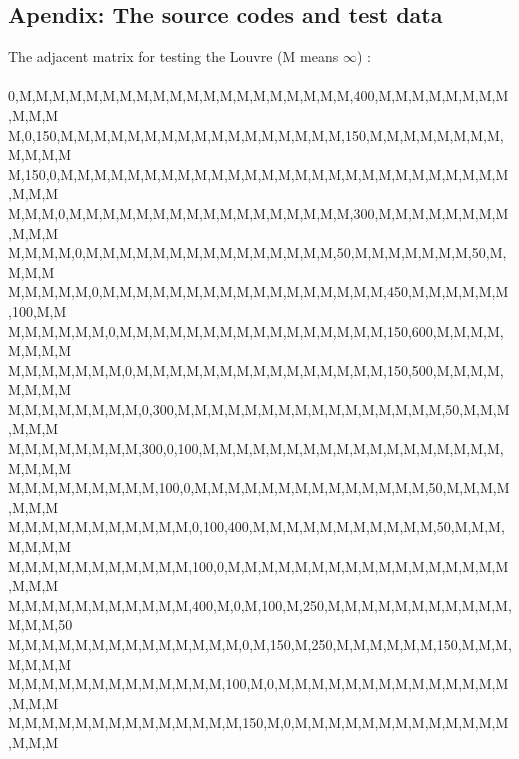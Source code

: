 \documentclass[12pt]{article}
\begin{document}
\clearpage
\begin{subappendices}						%
\section*{Apendix: The source codes and test data}		%

The adjacent matrix for testing the Louvre (M means $\infty$) :\\
\\
\small{
{0,M,M,M,M,M,M,M,M,M,M,M,M,M,M,M,M,M,M,M,M,400,M,M,M,M,M,M,M,M,M,M,M}\\
{M,0,150,M,M,M,M,M,M,M,M,M,M,M,M,M,M,M,M,M,150,M,M,M,M,M,M,M,M,M,M,M,M}\\
{M,150,0,M,M,M,M,M,M,M,M,M,M,M,M,M,M,M,M,M,M,M,M,M,M,M,M,M,M,M,M,M,M}\\
{M,M,M,0,M,M,M,M,M,M,M,M,M,M,M,M,M,M,M,M,M,300,M,M,M,M,M,M,M,M,M,M,M}\\
{M,M,M,M,0,M,M,M,M,M,M,M,M,M,M,M,M,M,M,M,50,M,M,M,M,M,M,M,50,M,M,M,M}\\
{M,M,M,M,M,0,M,M,M,M,M,M,M,M,M,M,M,M,M,M,M,M,M,450,M,M,M,M,M,M,100,M,M}\\
{M,M,M,M,M,M,0,M,M,M,M,M,M,M,M,M,M,M,M,M,M,M,M,150,600,M,M,M,M,M,M,M,M}\\
{M,M,M,M,M,M,M,0,M,M,M,M,M,M,M,M,M,M,M,M,M,M,M,150,500,M,M,M,M,M,M,M,M}\\
{M,M,M,M,M,M,M,M,0,300,M,M,M,M,M,M,M,M,M,M,M,M,M,M,M,M,50,M,M,M,M,M,M}\\
{M,M,M,M,M,M,M,M,300,0,100,M,M,M,M,M,M,M,M,M,M,M,M,M,M,M,M,M,M,M,M,M,M}\\
{M,M,M,M,M,M,M,M,M,100,0,M,M,M,M,M,M,M,M,M,M,M,M,M,M,50,M,M,M,M,M,M,M}\\
{M,M,M,M,M,M,M,M,M,M,M,0,100,400,M,M,M,M,M,M,M,M,M,M,M,50,M,M,M,M,M,M,M}\\
{M,M,M,M,M,M,M,M,M,M,M,100,0,M,M,M,M,M,M,M,M,M,M,M,M,M,M,M,M,M,M,M,M}\\
{M,M,M,M,M,M,M,M,M,M,M,400,M,0,M,100,M,250,M,M,M,M,M,M,M,M,M,M,M,M,M,M,50}\\
{M,M,M,M,M,M,M,M,M,M,M,M,M,M,0,M,150,M,250,M,M,M,M,M,M,150,M,M,M,M,M,M,M}\\
{M,M,M,M,M,M,M,M,M,M,M,M,M,100,M,0,M,M,M,M,M,M,M,M,M,M,M,M,M,M,M,M,M}\\
{M,M,M,M,M,M,M,M,M,M,M,M,M,M,150,M,0,M,M,M,M,M,M,M,M,M,M,M,M,M,M,M,M}\\
}
\end{subappendices}
\end{document}
